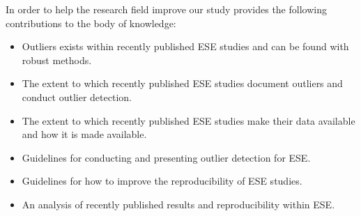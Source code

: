 In order to help the research field improve our study provides the following contributions to the body of knowledge:
\begin{itemize}
        \item Outliers exists within recently published ESE studies and can be found with robust methods.




        \item The extent to which recently published ESE studies document outliers and conduct outlier detection.




        \item The extent to which recently published ESE studies make their data available and how it is made available.




        \item Guidelines for conducting and presenting outlier detection for ESE\@.




        \item Guidelines for how to improve the reproducibility of ESE studies.




        \item An analysis of recently published results and reproducibility within ESE\@.
\end{itemize}
